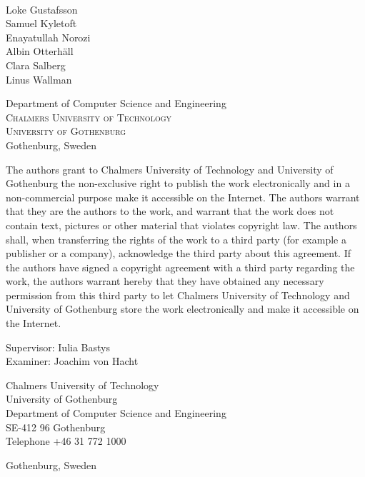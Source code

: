 \newpage
\thispagestyle{empty}
\begin{center}

	\textbf{\Large \ambaTitle} \\[1cm]

    {\linespread{1.2}\large
	Loke Gustafsson \\
	Samuel Kyletoft \\
	Enayatullah Norozi \\
	Albin Otterhäll \\
	Clara Salberg \\
	Linus Wallman \\
    }
	
	\vfill 	

	Department of Computer Science and Engineering\\
	\textsc{Chalmers University of Technology} \\
	\textsc{University of Gothenburg} \\
    Gothenburg, Sweden \the\year{} \\
\end{center}


\newpage
{The authors grant to Chalmers University of Technology and University of Gothenburg the
non-exclusive right to publish the work electronically and in a non-commercial purpose make it
accessible on the Internet. The authors warrant that they are the authors to the work, and
warrant that the work does not contain text, pictures or other material that violates
copyright law.
The authors shall, when transferring the rights of the work to a third party (for example a
publisher or a company), acknowledge the third party about this agreement. If the authors have
signed a copyright agreement with a third party regarding the work, the authors warrant
hereby that they have obtained any necessary permission from this third party to let Chalmers
University of Technology and University of Gothenburg store the work electronically and make
it accessible on the Internet.}

Supervisor: Iulia Bastys \\
Examiner: Joachim von Hacht \setlength{\parskip}{1cm}

Chalmers University of Technology\\
University of Gothenburg\\
Department of Computer Science and Engineering \\
SE-412 96 Gothenburg\\
Telephone +46 31 772 1000 \setlength{\parskip}{0.5cm}

\vfill
Gothenburg, Sweden \the\year{}
